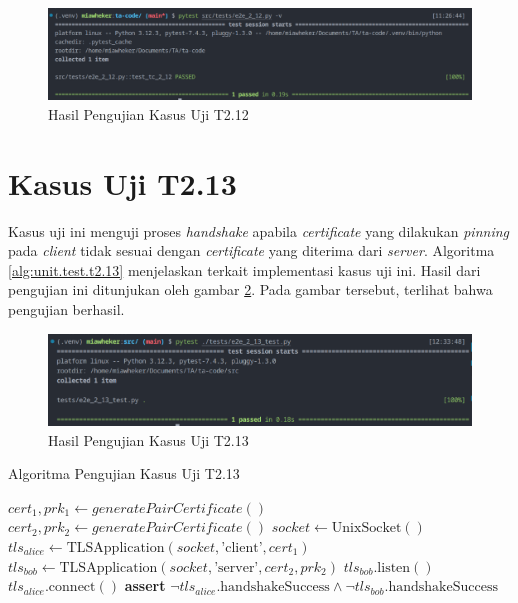\begin{figure}[ht]
  \centering
  \includegraphics[width=\textwidth]{chapters/res/appendix-4/2.12.png}
  \caption{Hasil Pengujian Kasus Uji T2.12}
  \label{fig:unit.test.t2.12}
\end{figure}

\section{Kasus Uji T2.13}

Kasus uji ini menguji proses \emph{handshake} apabila \emph{certificate} yang dilakukan \emph{pinning} pada \emph{client} tidak sesuai dengan \emph{certificate} yang diterima dari \emph{server}. Algoritma \ref{alg:unit.test.t2.13} menjelaskan terkait implementasi kasus uji ini. Hasil dari pengujian ini ditunjukan oleh gambar \ref{fig:unit.test.t2.13}. Pada gambar tersebut, terlihat bahwa pengujian berhasil.

\begin{figure}[ht]
  \centering
  \includegraphics[width=\textwidth]{chapters/res/appendix-4/2.13.png}
  \caption{Hasil Pengujian Kasus Uji T2.13}
  \label{fig:unit.test.t2.13}
\end{figure}


\begin{algorithm}
  \caption{Algoritma Pengujian Kasus Uji T2.13}
  \label{alg:unit.test.t2.13}
  \begin{algorithmic}
    \State $cert_1, prk_1 \gets generatePairCertificate()$
    \State $cert_2, prk_2 \gets generatePairCertificate()$
    \State $socket \gets \text{UnixSocket}()$
    \State $tls_{alice} \gets \text{TLSApplication}(socket, \text{'client'}, cert_1)$ 
    \State $tls_{bob} \gets \text{TLSApplication}(socket, \text{'server'}, cert_2, prk_2)$
    \State
    \State $tls_{bob}.\text{listen}()$  
    \State $tls_{alice}.\text{connect}()$  
    \State
    \State
    \State \textbf{assert} $\lnot tls_{alice}.\text{handshakeSuccess} \land \lnot tls_{bob}.\text{handshakeSuccess}$
  \end{algorithmic}
\end{algorithm}

